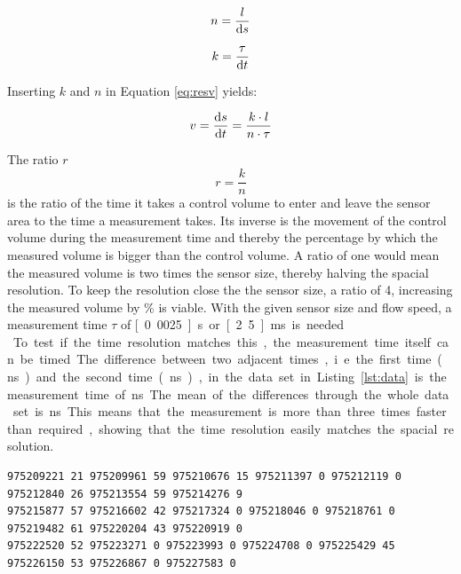\begin{equation}
	n = \dfrac{l}{\mathop{}\!\mathrm{d} s}
\label{eq:resn} 
\end{equation}

\begin{equation}
	k = \dfrac{ \tau}{\mathop{}\!\mathrm{d} t}
\label{eq:resk}
\end{equation}

Inserting $ k $ and $ n $ in Equation \eqref{eq:resv} yields:

\begin{equation}
	v = \dfrac{\mathop{}\!\mathrm{d} s}{\mathop{}\!\mathrm{d} t} = \dfrac{k \cdot l}{n \cdot \tau}
\label{eq:resv1} 
\end{equation}

The ratio $ r $
\begin{equation}
	r = \frac{k}{n}
\label{eq:resr} 
\end{equation}
is the ratio of the time it takes a control volume to enter and leave the sensor area  to the time a measurement takes. Its inverse is the movement of the control volume during the measurement time and thereby the percentage by which the measured volume is bigger than the control volume. A ratio of one would mean the measured volume is two times the sensor size, thereby halving the spacial resolution. To keep the resolution close the the sensor size, a ratio of 4, increasing the measured volume by \unit[25]{\%} is viable.
With the given sensor size and flow speed, a measurement time $ \tau $ of \unit[0.0025]{s} or \unit[2.5]{ms} is needed.\\

To test if the time resolution matches this, the measurement time itself can be timed. The difference between two adjacent times, i.e. the first time (\unit[975209221]{ns}) and the second time (\unit[975209961]{ns}), in the data set in Listing \ref{lst:data} is the measurement time of \unit[740]{ns}. The mean of the differences through the whole data set is \unit[748]{ns}. This means that the measurement is more than three times faster than required, showing that the time resolution easily matches the spacial resolution.

\begin{lstlisting}[caption={An excerpt of measurement data showing three lines of data from eight sensors. The long numbers are the times at which the measurements were taken in nanoseconds measured from the start, the short numbers are the measured values.},label={lst:data}]
975209221 21 975209961 59 975210676 15 975211397 0 975212119 0 975212840 26 975213554 59 975214276 9 
975215877 57 975216602 42 975217324 0 975218046 0 975218761 0 975219482 61 975220204 43 975220919 0 
975222520 52 975223271 0 975223993 0 975224708 0 975225429 45 975226150 53 975226867 0 975227583 0  
\end{lstlisting}

